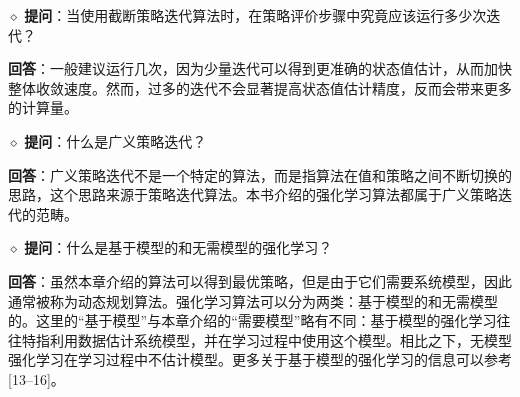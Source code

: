 $\diamond$ \textbf{提问}：当使用截断策略迭代算法时，在策略评价步骤中究竟应该运行多少次迭代？

\textbf{回答}：一般建议运行几次，因为少量迭代可以得到更准确的状态值估计，从而加快整体收敛速度。然而，过多的迭代不会显著提高状态值估计精度，反而会带来更多的计算量。

$\diamond$ \textbf{提问}：什么是广义策略迭代？

\textbf{回答}：广义策略迭代不是一个特定的算法，而是指算法在值和策略之间不断切换的思路，这个思路来源于策略迭代算法。本书介绍的强化学习算法都属于广义策略迭代的范畴。

$\diamond$ \textbf{提问}：什么是基于模型的和无需模型的强化学习？

\textbf{回答}：虽然本章介绍的算法可以得到最优策略，但是由于它们需要系统模型，因此通常被称为动态规划算法。强化学习算法可以分为两类：基于模型的和无需模型的。这里的“基于模型”与本章介绍的“需要模型”略有不同：基于模型的强化学习往往特指利用数据估计系统模型，并在学习过程中使用这个模型。相比之下，无模型强化学习在学习过程中不估计模型。更多关于基于模型的强化学习的信息可以参考 [13--16]。
